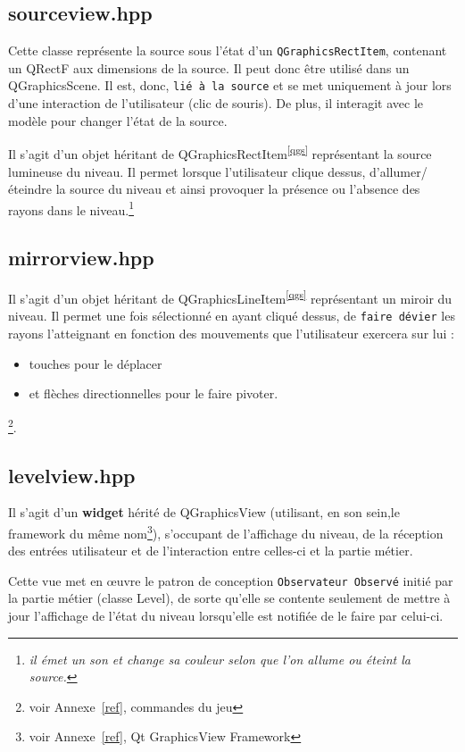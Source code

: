\documentclass[a4paper,11pt]{report}
\begin{document}
\subsection[La source]{sourceview.hpp}
Cette classe représente la source sous l'état d'un \texttt{QGraphicsRectItem}, contenant
un QRectF aux dimensions de la source. Il peut donc être utilisé dans un 
QGraphicsScene. Il est, donc, \texttt{lié à la source} et se met uniquement à jour 
lors d'une interaction de l'utilisateur (clic de souris). De plus, il interagit
avec le modèle pour changer l'état de la source.

Il s'agit d'un objet héritant de QGraphicsRectItem\textsuperscript{\ref{qgs}} représentant la source
lumineuse du niveau. Il permet lorsque l'utilisateur clique dessus, 
d'allumer/éteindre la source du niveau et ainsi provoquer la présence ou 
l'absence des rayons dans le niveau.\footnote{\textit{il émet un son et change sa couleur selon que l'on allume ou
éteint la source.}}

\subsection[Le miroir]{mirrorview.hpp}
Il s'agit d'un objet héritant de QGraphicsLineItem\textsuperscript{\ref{qgs}} représentant un miroir du
niveau. Il permet une fois sélectionné en ayant cliqué dessus, de \texttt{faire
dévier} les rayons l'atteignant en fonction des mouvements que l'utilisateur exercera 
sur lui :
\begin{itemize}
	\item touches pour le déplacer 
	\item et flèches directionnelles pour le faire pivoter.
\end{itemize}\footnote{voir Annexe~\ref{ref}, commandes du jeu}.

\subsection[Le niveau]{levelview.hpp}
Il s'agit d'un \textbf{widget} hérité de QGraphicsView (utilisant, en son sein,le
framework du même nom\footnote{\label{qgv}voir Annexe~\ref{ref}, Qt GraphicsView
Framework}), s'occupant de l'affichage du niveau, de la réception
des entrées utilisateur et de l'interaction entre celles-ci et la partie
métier. 

Cette vue met en œuvre le patron de conception \texttt{Observateur Observé} initié par
la partie métier (classe Level), de sorte qu'elle se contente seulement de
mettre à jour l'affichage de l'état du niveau lorsqu'elle est notifiée de le
faire par celui-ci. 
\end{document}
